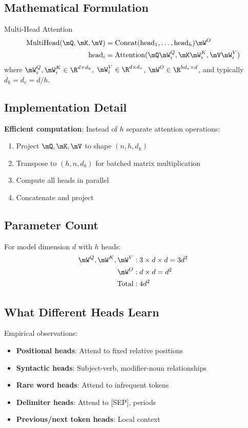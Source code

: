\subsection{Mathematical Formulation}

\begin{mathresult}{Multi-Head Attention}
\begin{align}
\text{MultiHead}(\mQ, \mK, \mV) &= \text{Concat}(\text{head}_1, \ldots, \text{head}_h)\mW^O \\
\text{head}_i &= \text{Attention}(\mQ\mW_i^Q, \mK\mW_i^K, \mV\mW_i^V)
\end{align}
where $\mW_i^Q, \mW_i^K \in \R^{d \times d_k}$, $\mW_i^V \in \R^{d \times d_v}$, $\mW^O \in \R^{hd_v \times d}$, and typically $d_k = d_v = d/h$.
\end{mathresult}

\subsection{Implementation Detail}

\textbf{Efficient computation}: Instead of $h$ separate attention operations:
\begin{enumerate}
    \item Project $\mQ, \mK, \mV$ to shape $(n, h, d_k)$
    \item Transpose to $(h, n, d_k)$ for batched matrix multiplication
    \item Compute all heads in parallel
    \item Concatenate and project
\end{enumerate}

\subsection{Parameter Count}

For model dimension $d$ with $h$ heads:
\begin{align}
\mW^Q, \mW^K, \mW^V &: 3 \times d \times d = 3d^2 \\
\mW^O &: d \times d = d^2 \\
\text{Total} &: 4d^2
\end{align}

\subsection{What Different Heads Learn}

Empirical observations:
\begin{itemize}
    \item \textbf{Positional heads}: Attend to fixed relative positions
    \item \textbf{Syntactic heads}: Subject-verb, modifier-noun relationships
    \item \textbf{Rare word heads}: Attend to infrequent tokens
    \item \textbf{Delimiter heads}: Attend to [SEP], periods
    \item \textbf{Previous/next token heads}: Local context
\end{itemize}

